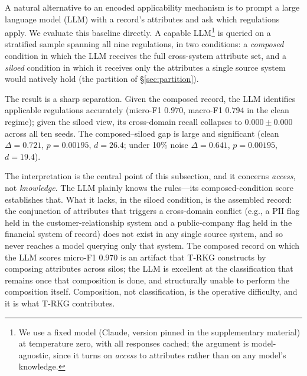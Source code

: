 \documentclass{ieeeaccess}
\begin{document}
A natural alternative to an encoded applicability mechanism is to prompt a large language model (LLM) with a record's attributes and ask which regulations apply. We evaluate this baseline directly. A capable LLM\footnote{We use a fixed model (Claude, version pinned in the supplementary material) at temperature zero, with all responses cached; the argument is model-agnostic, since it turns on \emph{access} to attributes rather than on any model's knowledge.} is queried on a stratified sample spanning all nine regulations, in two conditions: a \emph{composed} condition in which the LLM receives the full cross-system attribute set, and a \emph{siloed} condition in which it receives only the attributes a single source system would natively hold (the partition of §\ref{sec:partition}).

The result is a sharp separation. Given the composed record, the LLM identifies applicable regulations accurately (micro-F1 $0.970$, macro-F1 $0.794$ in the clean regime); given the siloed view, its cross-domain recall collapses to $0.000 \pm 0.000$ across all ten seeds. The composed--siloed gap is large and significant (clean $\Delta = 0.721$, $p = 0.00195$, $d = 26.4$; under 10\% noise $\Delta = 0.641$, $p = 0.00195$, $d = 19.4$).

The interpretation is the central point of this subsection, and it concerns \emph{access}, not \emph{knowledge}. The LLM plainly knows the rules---its composed-condition score establishes that. What it lacks, in the siloed condition, is the assembled record: the conjunction of attributes that triggers a cross-domain conflict (e.g., a PII flag held in the customer-relationship system and a public-company flag held in the financial system of record) does not exist in any single source system, and so never reaches a model querying only that system. The composed record on which the LLM scores micro-F1 $0.970$ is an artifact that T-RKG constructs by composing attributes across silos; the LLM is excellent at the classification that remains once that composition is done, and structurally unable to perform the composition itself. Composition, not classification, is the operative difficulty, and it is what T-RKG contributes.
\end{document}
